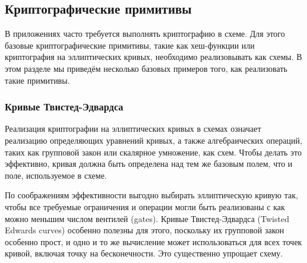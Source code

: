 \subsection{Криптографические примитивы}
В приложениях часто требуется выполнять криптографию в схеме. Для этого базовые криптографические примитивы, такие как хеш-функции или криптография на эллиптических кривых, необходимо реализовывать как схемы. В этом разделе мы приведём несколько базовых примеров того, как реализовать такие примитивы.
\subsubsection{Кривые Твистед-Эдвардса} Реализация криптографии на эллиптических кривых в схемах означает реализацию определяющих уравнений кривых, а также алгебраических операций, таких как групповой закон или скалярное умножение, как схем. Чтобы делать это эффективно, кривая должна быть определена над тем же базовым полем, что и поле, используемое в схеме.

По соображениям эффективности выгодно выбирать эллиптическую кривую так, чтобы все требуемые ограничения и операции могли быть реализованы с как можно меньшим числом вентилей (gates). Кривые Твистед-Эдвардса (Twisted Edwards curves) особенно полезны для этого, поскольку их групповой закон особенно прост, и одно и то же вычисление может использоваться для всех точек кривой, включая точку на бесконечности. Это существенно упрощает схему.
